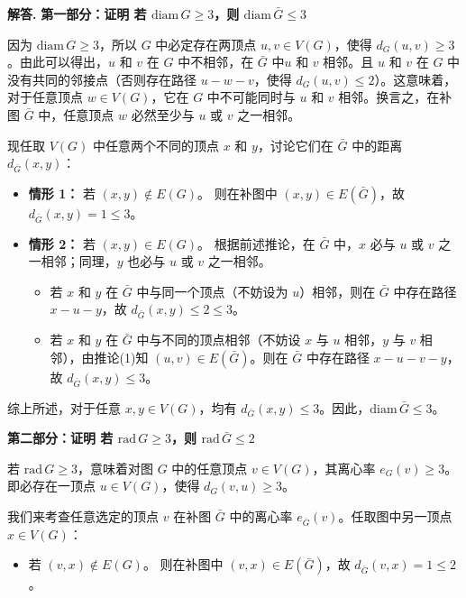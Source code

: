 \documentclass[12pt, a4paper, oneside]{ctexart}
\newenvironment{solution}{\par\noindent\textbf{解答. }}{\par}
\begin{document}
\begin{solution}
    \noindent\textbf{第一部分：证明 若 $\text{diam}\,G \ge 3$，则 $\text{diam}\,\bar{G} \le 3$}

    因为 $\text{diam}\,G \ge 3$，所以 $G$ 中必定存在两顶点 $u, v \in V(G)$，使得 $d_G(u, v) \ge 3$。由此可以得出，$u$ 和 $v$ 在 $G$ 中不相邻，在 $\bar{G}$ 中$u$ 和 $v$ 相邻。且 $u$ 和 $v$ 在 $G$ 中没有共同的邻接点（否则存在路径 $u-w-v$，使得 $d_G(u,v) \le 2$）。这意味着，对于任意顶点 $w \in V(G)$，它在 $G$ 中不可能同时与 $u$ 和 $v$ 相邻。换言之，在补图 $\bar{G}$ 中，任意顶点 $w$ 必然至少与 $u$ 或 $v$ 之一相邻。

现任取 $V(G)$ 中任意两个不同的顶点 $x$ 和 $y$，讨论它们在 $\bar{G}$ 中的距离 $d_{\bar{G}}(x, y)$：
\begin{itemize}
    \item \textbf{情形 1：} 若 $(x,y)\notin E(G)$。
    则在补图中 $(x,y) \in E(\bar{G})$，故 $d_{\bar{G}}(x, y) = 1 \le 3$。
    
    \item \textbf{情形 2：} 若 $(x,y) \in E(G)$。
    根据前述推论，在 $\bar{G}$ 中，$x$ 必与 $u$ 或 $v$ 之一相邻；同理，$y$ 也必与 $u$ 或 $v$ 之一相邻。
    \begin{itemize}
        \item 若 $x$ 和 $y$ 在 $\bar{G}$ 中与同一个顶点（不妨设为 $u$）相邻，则在 $\bar{G}$ 中存在路径 $x-u-y$，故 $d_{\bar{G}}(x, y) \le 2 \le 3$。
        \item 若 $x$ 和 $y$ 在 $\bar{G}$ 中与不同的顶点相邻（不妨设 $x$ 与 $u$ 相邻，$y$ 与 $v$ 相邻），由推论(1)知 $(u,v) \in E(\bar{G})$。则在 $\bar{G}$ 中存在路径 $x-u-v-y$，故 $d_{\bar{G}}(x, y) \le 3$。
    \end{itemize}
\end{itemize}
综上所述，对于任意 $x, y \in V(G)$，均有 $d_{\bar{G}}(x, y) \le 3$。因此，$\text{diam}\,\bar{G} \le 3$。

\vspace{1em}
\noindent\textbf{第二部分：证明 若 $\text{rad}\,G \ge 3$，则 $\text{rad}\,\bar{G} \le 2$}

若 $\text{rad}\,G \ge 3$，意味着对图 $G$ 中的任意顶点 $v \in V(G)$，其离心率 $e_G(v) \ge 3$。即必存在一顶点 $u \in V(G)$，使得 $d_G(v, u) \ge 3$。

我们来考查任意选定的顶点 $v$ 在补图 $\bar{G}$ 中的离心率 $e_{\bar{G}}(v)$。任取图中另一顶点 $x \in V(G)$：
\begin{itemize}
    \item 若 $(v,x) \notin E(G)$。
    则在补图中 $(v,x) \in E(\bar{G})$，故 $d_{\bar{G}}(v, x) = 1 \le 2$。
    

\end{itemize}
\end{solution}
\end{document}
